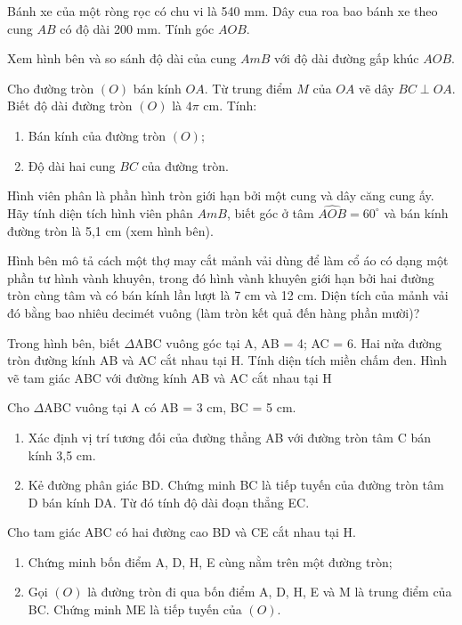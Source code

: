 \documentclass[%
    fontsize=12pt,%
    chapterprefix=false,%
    open=right,%
    twoside=false,%
    numbers=noenddot,%
    headings=optiontohead,%
    final,%
    DIV=15,%
    parskip=half %
]{scrbook}
\begin{document}
\begin{tuluan}
\item Bánh xe của một ròng rọc có chu vi là 540 mm. Dây cua roa bao bánh xe theo cung $AB$ có độ dài 200 mm. Tính góc $AOB$.

\item Xem hình bên và so sánh độ dài của cung $AmB$ với độ dài đường gấp khúc $AOB$.

\item Cho đường tròn $(O)$ bán kính $OA$. Từ trung điểm $M$ của $OA$ vẽ dây $BC \perp OA$. Biết độ dài đường tròn $(O)$ là $4\pi$ cm. Tính:
\begin{enumerate}[label=\alph*)]
  \item[a)] Bán kính của đường tròn $(O)$;
  \item[b)] Độ dài hai cung $BC$ của đường tròn.
\end{enumerate}

\item Hình viên phân là phần hình tròn giới hạn bởi một cung và dây căng cung ấy. Hãy tính diện tích hình viên phân $AmB$, biết góc ở tâm $\widehat{AOB} = 60^\circ$ và bán kính đường tròn là 5,1 cm (xem hình bên).

\item Hình bên mô tả cách một thợ may cắt mảnh vải dùng để làm cổ áo có dạng một phần tư hình vành khuyên, trong đó hình vành khuyên giới hạn bởi hai đường tròn cùng tâm và có bán kính lần lượt là 7 cm và 12 cm. Diện tích của mảnh vải đó bằng bao nhiêu decimét vuông (làm tròn kết quả đến hàng phần mười)?

\item Trong hình bên, biết $\Delta$ABC vuông góc tại A, AB = 4; AC = 6. Hai nửa đường tròn đường kính AB và AC cắt nhau tại H. Tính diện tích miền chấm đen. Hình vẽ tam giác ABC với đường kính AB và AC cắt nhau tại H

\item Cho $\Delta$ABC vuông tại A có AB = 3 cm, BC = 5 cm.
\begin{enumerate}[label=\alph*)]
  \item[a)] Xác định vị trí tương đối của đường thẳng AB với đường tròn tâm C bán kính 3,5 cm.
  \item[b)] Kẻ đường phân giác BD. Chứng minh BC là tiếp tuyến của đường tròn tâm D bán kính DA. Từ đó tính độ dài đoạn thẳng EC.
\end{enumerate}

\item Cho tam giác ABC có hai đường cao BD và CE cắt nhau tại H.
\begin{enumerate}[label=\alph*)]
  \item[a)] Chứng minh bốn điểm A, D, H, E cùng nằm trên một đường tròn;
  \item[b)] Gọi $(O)$ là đường tròn đi qua bốn điểm A, D, H, E và M là trung điểm của BC. Chứng minh ME là tiếp tuyến của $(O)$.
\end{enumerate}


\end{tuluan}
\end{document}
